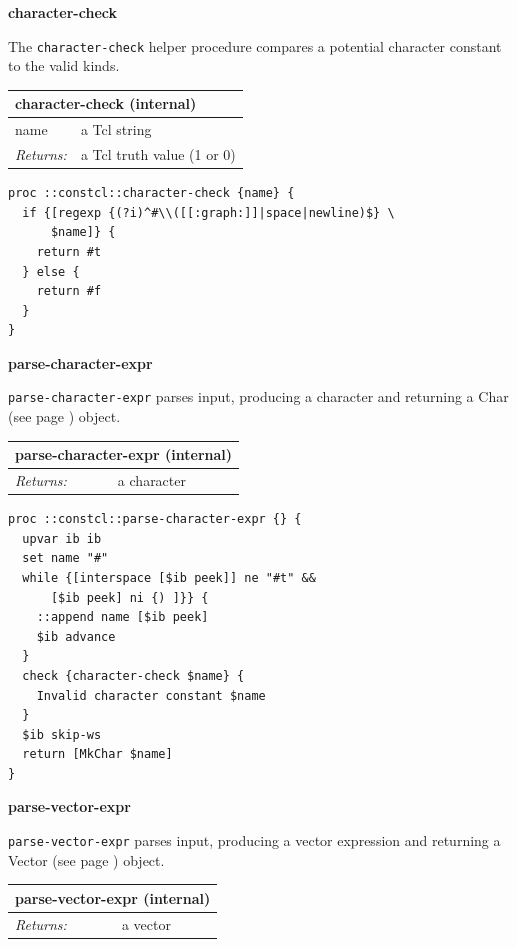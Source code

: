 \documentclass[twoside,9pt]{report}
\begin{document}
\textbf{character-check}


The \texttt{character-check} helper procedure compares a potential character constant to the valid kinds.

\begin{tabular}{ |l l| }
\hline
\multicolumn{2}{|l|}{character-check (internal)} \\
\hline
name & a Tcl string \\
\textit{Returns:} & a Tcl truth value (1 or 0) \\
\hline
\end{tabular}

\noindent\makebox[\linewidth]{\rule{\linewidth}{0.4pt}}
\begin{lstlisting}
proc ::constcl::character-check {name} {
  if {[regexp {(?i)^#\\([[:graph:]]|space|newline)$} \
      $name]} {
    return #t
  } else {
    return #f
  }
}
\end{lstlisting}
\noindent\makebox[\linewidth]{\rule{\linewidth}{0.4pt}}

\textbf{parse-character-expr}


\texttt{parse-character-expr} parses input, producing a character and returning a Char (see page \pageref{characters}) object.

\begin{tabular}{ |l l| }
\hline
\multicolumn{2}{|l|}{parse-character-expr (internal)} \\
\hline
\textit{Returns:} & a character \\
\hline
\end{tabular}

\noindent\makebox[\linewidth]{\rule{\linewidth}{0.4pt}}
\begin{lstlisting}
proc ::constcl::parse-character-expr {} {
  upvar ib ib
  set name "#"
  while {[interspace [$ib peek]] ne "#t" &&
      [$ib peek] ni {) ]}} {
    ::append name [$ib peek]
    $ib advance
  }
  check {character-check $name} {
    Invalid character constant $name
  }
  $ib skip-ws
  return [MkChar $name]
}
\end{lstlisting}
\noindent\makebox[\linewidth]{\rule{\linewidth}{0.4pt}}

\textbf{parse-vector-expr}


\texttt{parse-vector-expr} parses input, producing a vector expression and returning a Vector (see page \pageref{vectors}) object.

\begin{tabular}{ |l l| }
\hline
\multicolumn{2}{|l|}{parse-vector-expr (internal)} \\
\hline
\textit{Returns:} & a vector \\
\hline
\end{tabular}
\end{document}
